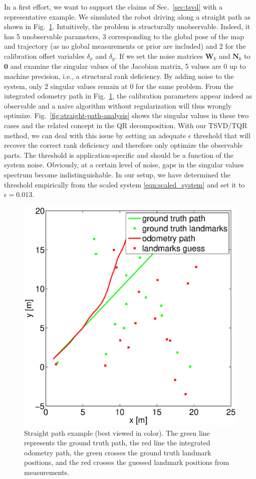 In a first effort, we want to support the claims of Sec.~\ref{sec:tsvd} with
a representative example. We simulated the robot driving along a straight
path as shown in Fig.~\ref{fig:straight-path}. Intuitively, the problem is
structurally unobservable. Indeed, it has 5 unobservable parameters, 3
corresponding to the global pose of the map and trajectory (as no global
measurements or prior are included) and 2 for the calibration offset variables
$\delta_x$ and $\delta_y$. If we set the noise matrices $\mathbf{W}_k$ and
$\mathbf{N}_k$ to $\mathbf{0}$ and examine the singular values of the Jacobian
matrix, 5 values are $0$ up to machine precision, i.e., a structural rank
deficiency. By adding noise to the system, only 2 singular values remain at $0$
for the same problem. From the integrated odometry path in
Fig.~\ref{fig:straight-path}, the calibration parameters appear indeed as
observable and a naive algorithm without regularization will thus wrongly
optimize. Fig.~\ref{fig:straight-path-analysis} shows the singular values in
these two cases and the related concept in the QR decomposition. With our
TSVD/TQR method, we can deal with this issue by setting an adequate $\epsilon$
threshold that will recover the correct rank deficiency and therefore only
optimize the observable parts. The threshold is application-specific and should
be a function of the system noise. Obviously, at a certain level of noise, gaps
in the singular values spectrum become indistinguishable. In our setup, we have
determined the threshold empirically from the scaled system
\eqref{eqn:scaled_system} and set it to $\epsilon=0.013$.

\begin{figure}[t]
\centering
\includegraphics[width=0.5\columnwidth]{fig/straight-path.eps}
\caption{Straight path example (best viewed in color). The green line
  represents the ground truth path, the red line the integrated odometry path,
  the green crosses the ground truth landmark positions, and the red crosses the
  guessed landmark positions from measurements.}
\label{fig:straight-path}
\end{figure}

